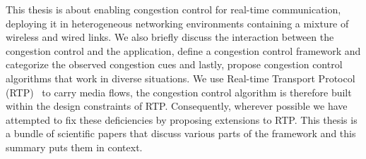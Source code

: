 



This thesis is about enabling congestion control for real-time communication,
deploying it in heterogeneous networking environments containing a mixture of
wireless and wired links. We also briefly discuss the interaction between the
congestion control and the application, define a congestion control framework
and categorize the observed congestion cues and lastly, propose congestion
control algorithms that work in diverse situations. We use Real-time Transport
Protocol (RTP)~\cite{rfc3550} to carry media flows, the congestion control
algorithm is therefore built within the design constraints of RTP.
Consequently, wherever possible we have attempted to fix these deficiencies by
proposing extensions to RTP. This thesis is a bundle of scientific papers that
discuss various parts of the framework and this summary puts them in context.


